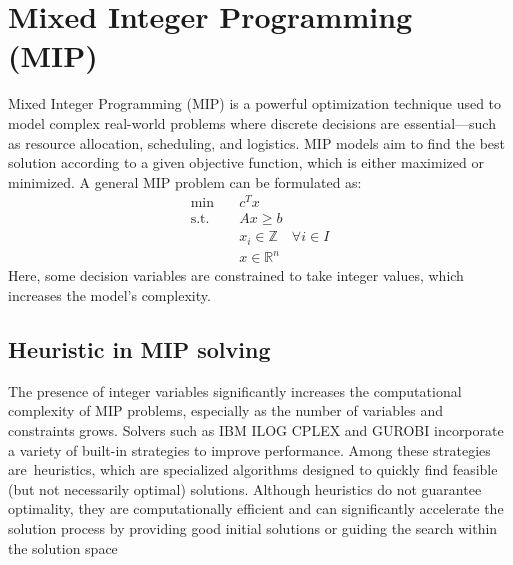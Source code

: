 \section{Mixed Integer Programming (MIP)}
Mixed Integer Programming (MIP) is a powerful optimization technique used to model complex real-world problems where discrete decisions are essential—such as resource allocation, scheduling, and logistics.
MIP models aim to find the best solution according to a given objective function, which is either maximized or minimized.
A general MIP problem can be formulated as:
\begin{align*}
\text{min} \quad & c^T x \\
\text{s.t.} \quad & Ax \geq b \\
                        & x_i \in \mathbb{Z} \quad \forall i \in I \\
                        & x \in \mathbb{R}^n
\end{align*}
Here, some decision variables are constrained to take integer values, which increases the model’s complexity.
\subsection{Heuristic in MIP solving}
The presence of integer variables significantly increases the computational complexity of MIP problems, especially as the number of variables and constraints grows. Solvers such as IBM ILOG CPLEX and GUROBI incorporate a variety of built-in strategies to improve performance.
Among these strategies are heuristics, which are specialized algorithms designed to quickly find feasible (but not necessarily optimal) solutions. Although heuristics do not guarantee optimality, they are computationally efficient and can significantly accelerate the solution 
process by providing good initial solutions or guiding the search within the solution space

